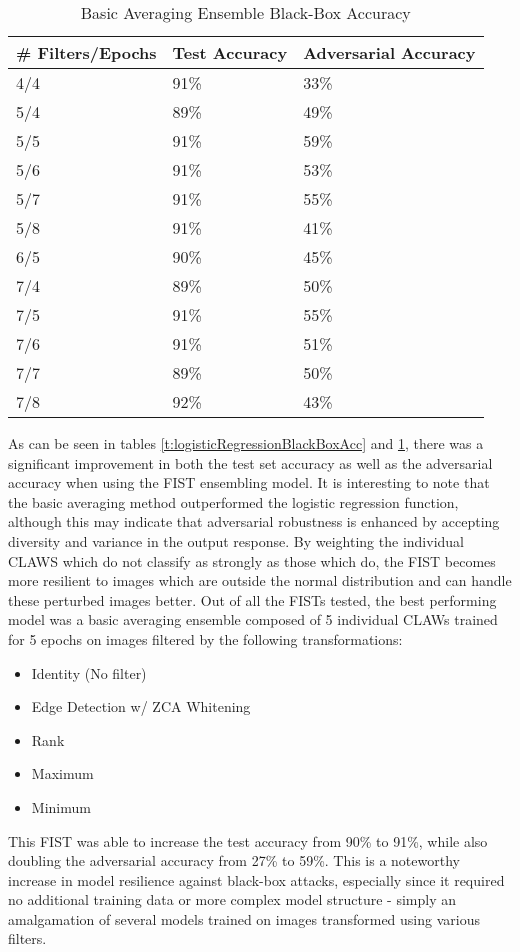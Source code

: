 \begin{table}
    \begin{center}
        \caption{Basic Averaging Ensemble Black-Box Accuracy}
        \label{t:basicAveragingBlackBoxAcc}
        \begin{tabular}{l|l|l}\hline
        \textbf{\# Filters/Epochs} & \textbf{Test Accuracy} & \textbf{Adversarial Accuracy}\\\hline
        4/4 & 91\% & 33\% \\\hline
        5/4 & 89\% & 49\% \\\hline
        5/5 & 91\% & 59\% \\\hline
        5/6 & 91\% & 53\% \\\hline
        5/7 & 91\% & 55\% \\\hline
        5/8 & 91\% & 41\% \\\hline
        6/5 & 90\% & 45\% \\\hline
        7/4 & 89\% & 50\% \\\hline
        7/5 & 91\% & 55\% \\\hline
        7/6 & 91\% & 51\% \\\hline
        7/7 & 89\% & 50\% \\\hline
        7/8 & 92\% & 43\% \\\hline
        \end{tabular}
    \end{center}
\end{table}

As can be seen in tables \ref{t:logisticRegressionBlackBoxAcc} and \ref{t:basicAveragingBlackBoxAcc}, there was a significant improvement in both the test set accuracy as well as the adversarial accuracy when using the FIST ensembling model.
It is interesting to note that the basic averaging method outperformed the logistic regression function, although this may indicate that adversarial robustness is enhanced by accepting diversity and variance in the output response.
By weighting the individual CLAWS which do not classify as strongly as those which do, the FIST becomes more resilient to images which are outside the normal distribution and can handle these perturbed images better.
Out of all the FISTs tested, the best performing model was a basic averaging ensemble composed of 5 individual CLAWs trained for 5 epochs on images filtered by the following transformations:

\begin{itemize}
    \item Identity (No filter)
    \item Edge Detection w/ ZCA Whitening
    \item Rank
    \item Maximum
    \item Minimum
\end{itemize}

This FIST was able to increase the test accuracy from 90\% to 91\%, while also doubling the adversarial accuracy from 27\% to 59\%.
This is a noteworthy increase in model resilience against black-box attacks, especially since it required no additional training data or more complex model structure - simply an amalgamation of several models trained on images transformed using various filters.